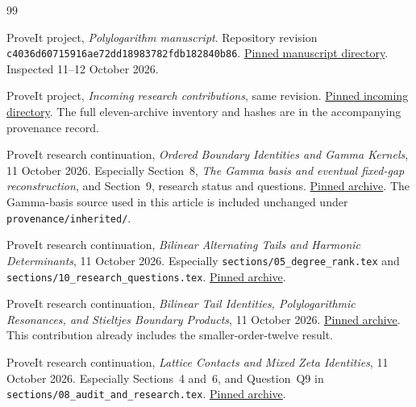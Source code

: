\documentclass[11pt,a4paper]{article}
\theoremstyle{definition}
\theoremstyle{remark}
\numberwithin{equation}{section}
\begin{document}
\begin{thebibliography}{99}
\raggedright
{}

ProveIt project, \emph{Polylogarithm manuscript}.
Repository revision \texttt{c4036d60715916ae72dd18983782fdb182840b86}.
\href{https://github.com/VladimirReshetnikov/ProveIt/tree/c4036d60715916ae72dd18983782fdb182840b86/Analysis/Polylogarithms/docs/manuscript}{Pinned manuscript directory}.
Inspected 11--12 October 2026.

ProveIt project, \emph{Incoming research contributions}, same revision.
\href{https://github.com/VladimirReshetnikov/ProveIt/tree/c4036d60715916ae72dd18983782fdb182840b86/docs/incoming}{Pinned incoming directory}.
The full eleven-archive inventory and hashes are in the accompanying
provenance record.

ProveIt research continuation,
\emph{Ordered Boundary Identities and Gamma Kernels}, 11 October 2026.
Especially Section~8, \emph{The Gamma basis and eventual fixed-gap
reconstruction}, and Section~9, research status and questions.
\href{https://github.com/VladimirReshetnikov/ProveIt/blob/c4036d60715916ae72dd18983782fdb182840b86/docs/incoming/ProveIt_Ordered_Boundary_Identities_2026-10-11.zip}{Pinned archive}.
The Gamma-basis source used in this article is included unchanged
under \texttt{provenance/inherited/}.

ProveIt research continuation,
\emph{Bilinear Alternating Tails and Harmonic Determinants},
11 October 2026. Especially
\texttt{sections/05\_degree\_rank.tex} and
\texttt{sections/10\_research\_questions.tex}.
\href{https://github.com/VladimirReshetnikov/ProveIt/blob/c4036d60715916ae72dd18983782fdb182840b86/docs/incoming/ProveIt_Bilinear_Tails_and_Determinants_2026-10-11.zip}{Pinned archive}.

ProveIt research continuation,
\emph{Bilinear Tail Identities, Polylogarithmic Resonances,
and Stieltjes Boundary Products}, 11 October 2026.
\href{https://github.com/VladimirReshetnikov/ProveIt/blob/c4036d60715916ae72dd18983782fdb182840b86/docs/incoming/ProveIt_Tail_Kernels_and_Boundary_Products_2026-10-11.zip}{Pinned archive}.
This contribution already includes the smaller-order-twelve result.

ProveIt research continuation,
\emph{Lattice Contacts and Mixed Zeta Identities},
11 October 2026. Especially Sections~4 and~6, and Question~Q9
in \texttt{sections/08\_audit\_and\_research.tex}.
\href{https://github.com/VladimirReshetnikov/ProveIt/blob/c4036d60715916ae72dd18983782fdb182840b86/docs/incoming/ProveIt_Lattice_Contacts_and_Mixed_Zeta_Identities_2026-10-11.zip}{Pinned archive}.


\end{thebibliography}
\end{document}
